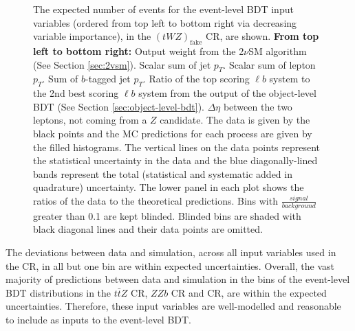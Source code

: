 \begin{figure}[htbp]
\caption{The expected number of events for the event-level BDT input variables (ordered from top left to bottom right via decreasing variable importance), in the $(tWZ)_{\text{fake}}$ CR, are shown. \textbf{From top left to bottom right:} Output weight from the 2$\nu$SM algorithm (See Section \ref{sec:2vsm}). Scalar sum of jet $p_{T}$. Scalar sum of lepton $p_{T}$. Sum of $b$-tagged jet $p_{T}$. Ratio of the top scoring $\ell b$ system to the 2nd best scoring $\ell b$ system from the output of the object-level BDT (See Section \ref{sec:object-level-bdt}). $\Delta \eta$ between the two leptons, not coming from a $Z$ candidate. The data is given by the black points and the MC predictions for each process are given by the filled histograms. The vertical lines on the data points represent the statistical uncertainty in the data and the blue diagonally-lined bands represent the total (statistical and systematic added in quadrature) uncertainty. The lower panel in each plot shows the ratios of the data to the theoretical predictions. Bins with $\frac{signal}{background}$ greater than 0.1 are kept blinded. Blinded bins are shaded with black diagonal lines and their data points are omitted.}
  \label{fig:4lep-tWZfakeCR-eventbdt-vars}
\end{figure}

The deviations between data and simulation, across all input variables used in the \tWZfake CR, in all but one bin are within expected uncertainties. Overall, the vast majority of predictions between data and simulation in the bins of the event-level BDT distributions in the $t\bar{t}Z$ CR, $ZZb$ CR and \tWZfake CR, are within the expected uncertainties. Therefore, these input variables are well-modelled and reasonable to include as inputs to the event-level BDT.\\

